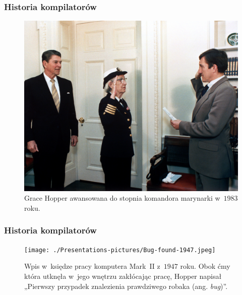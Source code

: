 \documentclass[10pt,t]{beamer}
\begin{document}
\begin{frame}
  \frametitle{Historia kompilatorów}

  \vspace{-0.5em}



  \begin{figure}

    \centering


    \includegraphics[scale=0.3]
    {./Presentations-pictures/Grace-Hopper-promoted-to-Commodore.jpeg}

    \caption{Grace Hopper awansowana do stopnia komandora marynarki
      w~$1983$ roku.}

  \end{figure}

\end{frame}





\begin{frame}
  \frametitle{Historia kompilatorów}

  \vspace{-0.5em}



  \begin{figure}

    \centering


    \texttt{[image: ./Presentations-pictures/Bug-found-1947.jpeg]}

    \caption{Wpis w~księdze pracy komputera Mark~II z~$1947$ roku. Obok ćmy
      która utknęła w~jego wnętrzu zakłócając pracę, Hopper napisał
      „Pierwszy przypadek znalezienia prawdziwego robaka (ang.
      \textit{bug})”.}

  \end{figure}

\end{frame}
\end{document}
